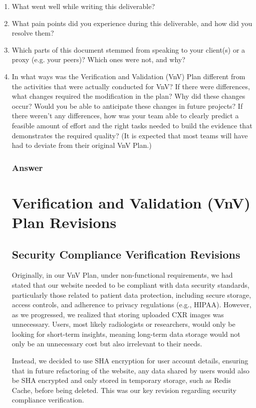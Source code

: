 \documentclass[12pt, titlepage]{article}
\begin{document}
\begin{enumerate}
  \item What went well while writing this deliverable? 
  \item What pain points did you experience during this deliverable, and how
    did you resolve them?
  \item Which parts of this document stemmed from speaking to your client(s) or
  a proxy (e.g. your peers)? Which ones were not, and why?
  \item In what ways was the Verification and Validation (VnV) Plan different
  from the activities that were actually conducted for VnV?  If there were
  differences, what changes required the modification in the plan?  Why did
  these changes occur?  Would you be able to anticipate these changes in future
  projects?  If there weren't any differences, how was your team able to clearly
  predict a feasible amount of effort and the right tasks needed to build the
  evidence that demonstrates the required quality?  (It is expected that most
  teams will have had to deviate from their original VnV Plan.)


  \subsubsection{Answer}
  \section{Verification and Validation (VnV) Plan Revisions}

  \subsection{Security Compliance Verification Revisions}
  
  Originally, in our VnV Plan, under non-functional requirements, we had stated that our website needed to be compliant with data security standards, particularly those related to patient data protection, including secure storage, access controls, and adherence to privacy regulations (e.g., HIPAA). However, as we progressed, we realized that storing uploaded CXR images was unnecessary. Users, most likely radiologists or researchers, would only be looking for short-term insights, meaning long-term data storage would not only be an unnecessary cost but also irrelevant to their needs. 
  
  Instead, we decided to use SHA encryption for user account details, ensuring that in future refactoring of the website, any data shared by users would also be SHA encrypted and only stored in temporary storage, such as Redis Cache, before being deleted. This was our key revision regarding security compliance verification.
  

\end{enumerate}
\end{document}
